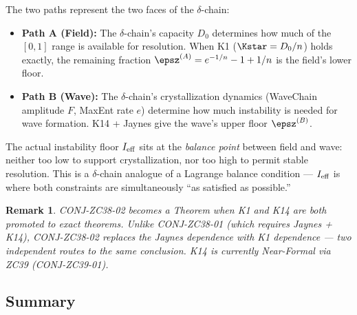 \documentclass[12pt, a4paper]{article}
\newtheorem{remark}{Remark}[section]
\begin{document}
The two paths represent the two faces of the $\delta$-chain:

\begin{itemize}[leftmargin=*]
\item \textbf{Path A (Field):} The $\delta$-chain's capacity $D_0$
determines how much of the $[0,1]$ range is available for resolution.
When K1 ($\Kstar = D_0/n$) holds exactly, the remaining fraction
$\epsz^{(A)} = e^{-1/n} - 1 + 1/n$ is the field's lower floor.

\item \textbf{Path B (Wave):} The $\delta$-chain's crystallization
dynamics (WaveChain amplitude $F$, MaxEnt rate $e$) determine how
much instability is needed for wave formation.
K14 + Jaynes give the wave's upper floor $\epsz^{(B)}$.
\end{itemize}

\noindent
The actual instability floor $I_{\rm eff}$ sits at the
\emph{balance point} between field and wave:
neither too low to support crystallization,
nor too high to permit stable resolution.
This is a $\delta$-chain analogue of a Lagrange balance condition ---
$I_{\rm eff}$ is where both constraints are simultaneously
``as satisfied as possible.''

\begin{remark}
CONJ-ZC38-02 becomes a Theorem when K1 and K14 are both promoted
to exact theorems. Unlike CONJ-ZC38-01 (which requires Jaynes + K14),
CONJ-ZC38-02 replaces the Jaynes dependence with K1 dependence ---
two independent routes to the same conclusion.
K14 is currently Near-Formal via ZC39 (CONJ-ZC39-01).
\end{remark}

\subsection{Summary}
\label{sec:summary}
\end{document}
